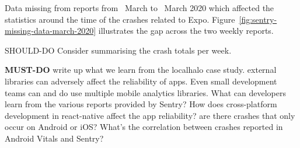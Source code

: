 Data missing from reports from~ March to~ March 2020 which affected the statistics around the time of the crashes related to Expo. Figure~\ref{fig:sentry-missing-data-march-2020} illustrates the gap across the two weekly reports. 

SHOULD-DO Consider summarising the crash totals per week. 

\textbf{MUST-DO} write up what we learn from the localhalo case study. external libraries can adversely affect the reliability of apps. Even small development teams can and do use multiple mobile analytics libraries. What can developers learn from the various reports provided by Sentry? How does cross-platform development in react-native affect the app reliability? are there crashes that only occur on Android or iOS? What's the correlation between crashes reported in Android Vitals and Sentry?

